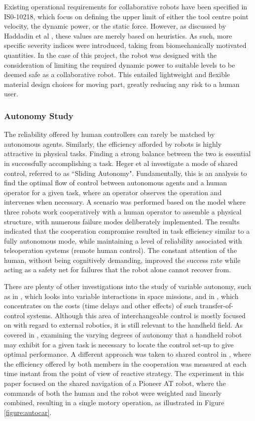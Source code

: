 \documentclass[11pt]{article}
\begin{document}
Existing operational requirements for collaborative robots have been specified in IS0-10218, which focus on defining the upper limit of either the tool centre point velocity, the dynamic power, or the static force. However, as discussed by Haddadin et al \cite{Haddadin2007}, these values are merely based on heuristics. As such, more specific severity indices were introduced, taking from biomechanically motivated quantities. In the case of this project, the robot was designed with the consideration of limiting the required dynamic power to suitable levels to be deemed safe as a collaborative robot. This entailed lightweight and flexible material design choices for moving part, greatly reducing any risk to a human user.

\subsubsection{Autonomy Study}
The reliability offered by human controllers can rarely be matched by autonomous agents. Similarly, the efficiency afforded by robots is highly attractive in physical tasks. Finding a strong balance between the two is essential in successfully accomplishing a task. Heger et al \cite{heger2006} investigate a mode of shared control, referred to as ``Sliding Autonomy". Fundamentally, this is an analysis to find the optimal flow of control between autonomous agents and a human operator for a given task, where an operator observes the operation and intervenes when necessary. A scenario was performed based on the model where three robots work cooperatively with a human operator to assemble a physical structure, with numerous failure modes deliberately implemented. The results indicated that the cooperation compromise resulted in task efficiency similar to a fully autonomous mode, while maintaining a level of reliability associated with teleoperation systems (remote human control). The constant attention of the human, without being cognitively demanding, improved the success rate while acting as a safety net for failures that the robot alone cannot recover from.

There are plenty of other investigations into the study of variable autonomy, such as in \cite{Dorais1999}, which looks into variable interactions in space missions, and in \cite{tambe2002}, which concentrates on the costs (time delays and other effects) of such transfer-of-control systems. Although this area of interchangeable control is mostly focused on with regard to external robotics, it is still relevant to the handheld field. As covered in \cite{GreggSmithDesign}, examining the varying degrees of autonomy that a handheld robot may exhibit for a given task is necessary to locate the control set-up to give optimal performance.
A different approach was taken to shared control in \cite{Poncela2009}, where the efficiency offered by both members in the cooperation was measured at each time instant from the point of view of reactive strategy. The experiment in this paper focused on the shared navigation of a Pioneer AT robot, where the commands of both the human and the robot were weighted and linearly combined, resulting in a single motory operation, as illustrated in Figure \ref{figure:autocar}.
\end{document}
